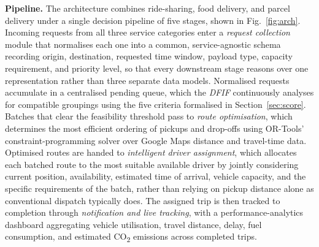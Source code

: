 \documentclass[conference]{IEEEtran}
\begin{document}
\textbf{Pipeline.} The architecture combines ride-sharing, food delivery, and parcel delivery
under a single decision pipeline of five stages, shown in
Fig.~\ref{fig:arch}. Incoming requests from all three service categories enter
a \emph{request collection} module that normalises each one into a common,
service-agnostic schema recording origin, destination, requested time window,
payload type, capacity requirement, and priority level, so that every
downstream stage reasons over one representation rather than three separate
data models. Normalised requests accumulate in a centralised pending queue,
which the \emph{DFIF} continuously analyses for compatible groupings using the
five criteria formalised in Section~\ref{sec:score}. Batches that clear the
feasibility threshold pass to \emph{route optimisation}, which determines the
most efficient ordering of pickups and drop-offs using OR-Tools'
constraint-programming solver over Google Maps distance and travel-time data.
Optimised routes are handed to \emph{intelligent driver assignment}, which
allocates each batched route to the most suitable available driver by jointly
considering current position, availability, estimated time of arrival, vehicle
capacity, and the specific requirements of the batch, rather than relying on
pickup distance alone as conventional dispatch typically does. The assigned
trip is then tracked to completion through \emph{notification and live
tracking}, with a performance-analytics dashboard aggregating vehicle
utilisation, travel distance, delay, fuel consumption, and estimated
CO\textsubscript{2} emissions across completed trips.
\end{document}
